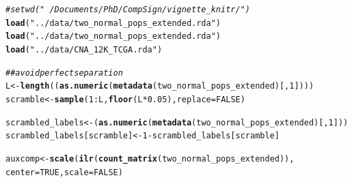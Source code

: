 \documentclass{article}\usepackage[]{graphicx}\usepackage[]{color}
\makeatletter
\newcommand{\hlnum}[1]{\textcolor[rgb]{0.686,0.059,0.569}{#1}}%
\newcommand{\hlstr}[1]{\textcolor[rgb]{0.192,0.494,0.8}{#1}}%
\newcommand{\hlcom}[1]{\textcolor[rgb]{0.678,0.584,0.686}{\textit{#1}}}%
\newcommand{\hlopt}[1]{\textcolor[rgb]{0,0,0}{#1}}%
\newcommand{\hlstd}[1]{\textcolor[rgb]{0.345,0.345,0.345}{#1}}%
\newcommand{\hlkwb}[1]{\textcolor[rgb]{0.69,0.353,0.396}{#1}}%
\newcommand{\hlkwc}[1]{\textcolor[rgb]{0.333,0.667,0.333}{#1}}%
\newcommand{\hlkwd}[1]{\textcolor[rgb]{0.737,0.353,0.396}{\textbf{#1}}}%
\newenvironment{kframe}{%
 \def\at@end@of@kframe{}%
 \ifinner\ifhmode%
  \def\at@end@of@kframe{\end{minipage}}%
  \begin{minipage}{\columnwidth}%
 \fi\fi%
 \def\FrameCommand##1{\hskip\@totalleftmargin \hskip-\fboxsep
 \colorbox{shadecolor}{##1}\hskip-\fboxsep
     \hskip-\linewidth \hskip-\@totalleftmargin \hskip\columnwidth}%
 \MakeFramed {\advance\hsize-\width
   \@totalleftmargin\z@ \linewidth\hsize
   \@setminipage}}%
 {\par\unskip\endMakeFramed%
 \at@end@of@kframe}
\newenvironment{knitrout}{}{} %
\makeatother
\begin{document}
\begin{knitrout}
\color{fgcolor}\begin{kframe}
\begin{alltt}
\hlcom{#setwd("~/Documents/PhD/CompSign/vignette_knitr/")}
\hlkwd{load}\hlstd{(}\hlstr{"../data/two_normal_pops_extended.rda"}\hlstd{)}
\hlkwd{load}\hlstd{(}\hlstr{"../data/two_normal_pops_extended.rda"}\hlstd{)}
\hlkwd{load}\hlstd{(}\hlstr{"../data/CNA_12K_TCGA.rda"}\hlstd{)}

\hlcom{## avoid perfect separation}
\hlstd{L} \hlkwb{<-} \hlkwd{length}\hlstd{((}\hlkwd{as.numeric}\hlstd{(}\hlkwd{metadata}\hlstd{(two_normal_pops_extended)[,}\hlnum{1}\hlstd{])))}
\hlstd{scramble} \hlkwb{<-} \hlkwd{sample}\hlstd{(}\hlnum{1}\hlopt{:}\hlstd{L,} \hlkwd{floor}\hlstd{(L}\hlopt{*}\hlnum{0.05}\hlstd{),} \hlkwc{replace} \hlstd{=} \hlnum{FALSE}\hlstd{)}

\hlstd{scrambled_labels} \hlkwb{<-} \hlstd{(}\hlkwd{as.numeric}\hlstd{(}\hlkwd{metadata}\hlstd{(two_normal_pops_extended)[,}\hlnum{1}\hlstd{]))}
\hlstd{scrambled_labels[scramble]} \hlkwb{<-} \hlnum{1}\hlopt{-}\hlstd{scrambled_labels[scramble]}

\hlstd{auxcomp} \hlkwb{<-} \hlkwd{scale}\hlstd{(}\hlkwd{ilr}\hlstd{(}\hlkwd{count_matrix}\hlstd{(two_normal_pops_extended)),}
                 \hlkwc{center} \hlstd{=} \hlnum{TRUE}\hlstd{,} \hlkwc{scale} \hlstd{=} \hlnum{FALSE}\hlstd{)}


\end{alltt}
\end{kframe}
\end{knitrout}
\end{document}
